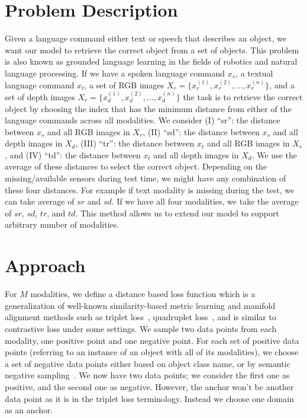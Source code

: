 \documentclass[sigconf,natbib=true,anonymous=true]{acmart}
\begin{document}

\section{Problem Description}
\label{sec:Problem-Description}

Given a language command either text or speech that describes an object, we want our model to retrieve the correct object from a set of objects. This problem is also known as grounded language learning in the fields of robotics and natural language processing.
If we have a spoken language command $x_s$, a textual language command $x_t$, a set of RGB images $X_r = \{x_r^{(1)}, x_r^{(2)}, ..., x_r^{(n)}\}$, and a set of depth images $X_r = \{x_d^{(1)}, x_d^{(2)}, ..., x_d^{(n)}\}$ the task is to retrieve the correct object by choosing the index that has the minimum distance from either of the language commands across all modalities.
We consider (I) ``sr'': the distance between $x_s$ and all RGB images in $X_r$, (II) ``sd'': the distance between $x_s$ and all depth images in $X_d$, (III) ``tr'': the distance between $x_t$ and all RGB images in $X_r$, and (IV) ``td'': the distance between $x_t$ and all depth images in $X_d$. We use the average of these distances to select the correct object. Depending on the missing/available sensors during test time, we might have any combination of these four distances. For example if text modality is missing during the test, we can take average of $sr$ and $sd$. If we have all four modalities, we take the average of $sr$, $sd$, $tr$, and $td$.
This method allows us to extend our model to support arbitrary number of modalities.




\section{Approach}
\label{sec:Method}

For $M$ modalities, we define a distance based loss function which is a generalization of well-known similarity-based metric learning and manifold alignment methods such as triplet loss~\cite{Carvalho-cooking-triplet,triplet_loss_2021_CVPR}, quadruplet loss~\cite{chen2017beyond}, and is similar to contrastive loss under some settings.
We sample two data points from each modality, one positive point and one negative point. 
For each set of positive data points (referring to an instance of an object with all of its modalities), we choose a set of negative data points either based on object class name, or by semantic negative sampling~\cite{Pillai_Matuszek_2018}. We now have two data points; we consider the first one as positive, and the second one as negative. However, the anchor won't be another data point as it is in the triplet loss terminology. Instead we choose one domain as an anchor. 
\end{document}
